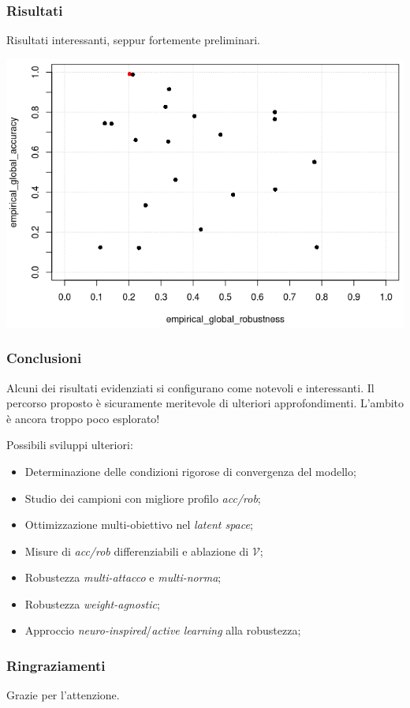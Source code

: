 \documentclass{beamer}
\begin{document}
{%

\begin{frame}
	\frametitle{Risultati}
	Risultati interessanti, seppur fortemente preliminari.
	\hfill\break

	\center \includegraphics[height=0.58\linewidth]{my-graph-scatterplot.png}

\end{frame}


\begin{frame}
	\frametitle{Conclusioni}
	Alcuni dei risultati evidenziati si configurano come notevoli e interessanti. Il percorso proposto è sicuramente meritevole di ulteriori \alert{approfondimenti}. L'ambito è ancora troppo poco esplorato!

	\hfill\break
	Possibili sviluppi ulteriori:
	\begin{itemize}
		\item{Determinazione delle condizioni rigorose di convergenza del modello;}
		\item{Studio dei campioni con migliore profilo \textit{acc/rob};}
		\item{Ottimizzazione multi-obiettivo nel \textit{latent space};}
		\item{Misure di \textit{acc/rob} differenziabili e ablazione di $\mathcal{V}$;}
		\item{Robustezza \textit{multi-attacco} e \textit{multi-norma};}
	\hfill\break
		\item{Robustezza \textit{weight-agnostic};}
		\item{Approccio \textit{neuro-inspired}/\textit{active learning} alla robustezza;}
	\end{itemize}

\end{frame}

\begin{frame}
	\frametitle{Ringraziamenti}
	Grazie per l'attenzione.
\end{frame}

}

\end{document}
